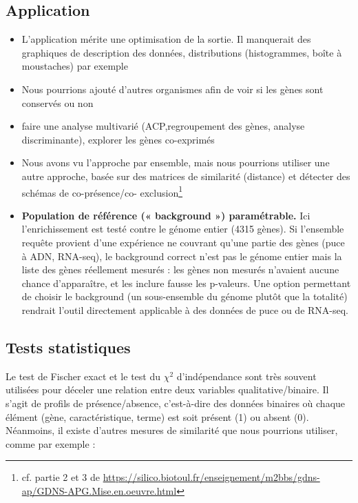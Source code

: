 \documentclass[a4paper,11pt,openright]{report}
\begin{document}
	\subsection{Application}
\begin{itemize}
\item L'application mérite une optimisation de la sortie. Il manquerait des graphiques de description des données, distributions (histogrammes, boîte à moustaches) par exemple 
\item Nous pourrions ajouté d'autres organismes afin de voir si les gènes sont conservés ou non
\item faire une analyse multivarié (ACP,regroupement des gènes, analyse discriminante), explorer les gènes co-exprimés
\item Nous avons vu l'approche par ensemble, mais nous pourrions utiliser une autre approche, basée sur des matrices de similarité (distance) et détecter des schémas de co-présence/co- exclusion\footnote{cf. partie 2 et 3 de \url{https://silico.biotoul.fr/enseignement/m2bbs/gdns-ap/GDNS-APG.Mise.en.oeuvre.html}}
\item \textbf{Population de référence (« background ») paramétrable.} Ici l'enrichissement est testé contre le génome entier (4315 gènes). Si l'ensemble requête provient d'une expérience ne couvrant qu'une partie des gènes (puce à ADN, RNA-seq), le background correct n'est pas le génome entier mais la liste des gènes réellement mesurés : les gènes non mesurés n'avaient aucune chance d'apparaître, et les inclure fausse les p-valeurs. Une option permettant de choisir le background (un sous-ensemble du génome plutôt que la totalité) rendrait l'outil directement applicable à des données de puce ou de RNA-seq.
\end{itemize}


	\subsection{Tests statistiques}
Le test de Fischer exact et le test du $\chi^2$ d’indépendance sont très souvent utilisées pour déceler une relation entre deux variables qualitative/binaire. Il s'agit de profils de présence/absence, c'est-à-dire des données binaires où chaque élément (gène, caractéristique, terme) est soit présent (1) ou absent (0). Néanmoins, il existe d'autres mesures de similarité que nous pourrions utiliser, comme par exemple : 
\end{document}
